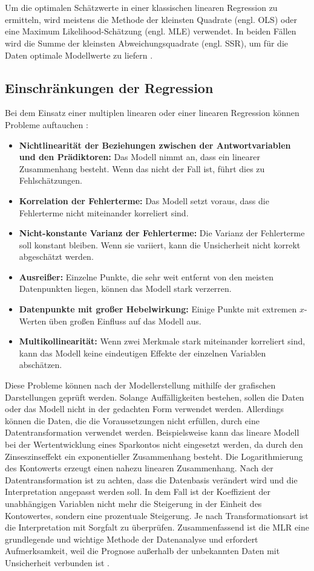 \\\\
Um die optimalen Schätzwerte in einer klassischen linearen Regression zu ermitteln, wird meistens die Methode der kleinsten Quadrate (engl. \ac{OLS}) oder eine Maximum Likelihood-Schätzung (engl. \ac{MLE}) verwendet. In beiden Fällen wird die Summe der kleinsten Abweichungsquadrate (engl. \ac{SSR}), um für die Daten optimale Modellwerte zu liefern \cite[S. 246]{frick2021data}. 
\subsection{Einschränkungen der Regression}
Bei dem Einsatz einer multiplen linearen oder einer linearen Regression können Probleme auftauchen \cite{james2013introduction}: 
\begin{itemize}
    \item \textbf{Nichtlinearität der Beziehungen zwischen der Antwortvariablen und den Prädiktoren:} Das Modell nimmt an, dass ein linearer Zusammenhang besteht. Wenn das nicht der Fall ist, führt dies zu Fehlschätzungen. 
    \item \textbf{Korrelation der Fehlerterme:} Das Modell setzt voraus, dass die Fehlerterme nicht miteinander korreliert sind.
    \item \textbf{Nicht-konstante Varianz der Fehlerterme:} Die Varianz der Fehlerterme soll konstant bleiben. Wenn sie variiert, kann die Unsicherheit nicht korrekt abgeschätzt werden.
    \item \textbf{Ausreißer:} Einzelne Punkte, die sehr weit entfernt von den meisten Datenpunkten liegen, können das Modell stark verzerren.
    \item \textbf{Datenpunkte mit großer Hebelwirkung:} Einige Punkte mit extremen \(x\)-Werten üben großen Einfluss auf das Modell aus.
    \item \textbf{Multikollinearität:} Wenn zwei Merkmale stark miteinander korreliert sind, kann das Modell keine eindeutigen Effekte der einzelnen Variablen abschätzen.
\end{itemize}
Diese Probleme können nach der Modellerstellung mithilfe der grafischen Darstellungen geprüft werden. Solange Auffälligkeiten bestehen, sollen die Daten oder das Modell nicht in der gedachten Form verwendet werden. Allerdings können die Daten, die die Voraussetzungen nicht erfüllen, durch eine Datentransformation verwendet werden. Beispielsweise kann das lineare Modell bei der Wertentwicklung eines Sparkontos nicht eingesetzt werden, da durch den Zinseszinseffekt ein exponentieller Zusammenhang besteht. Die Logarithmierung des Kontowerts erzeugt einen nahezu linearen Zusammenhang. Nach der Datentransformation ist zu achten, dass die Datenbasis verändert wird und die Interpretation angepasst werden soll. In dem Fall ist der Koeffizient der unabhängigen Variablen nicht mehr die Steigerung in der Einheit des Kontowertes, sondern eine prozentuale Steigerung. Je nach Transformationsart ist die Interpretation mit Sorgfalt zu überprüfen. Zusammenfassend ist die \ac{MLR} eine grundlegende und wichtige Methode der Datenanalyse und erfordert Aufmerksamkeit, weil die Prognose außerhalb der unbekannten Daten mit Unsicherheit verbunden ist \cite{akinkunmi2018data}. 

